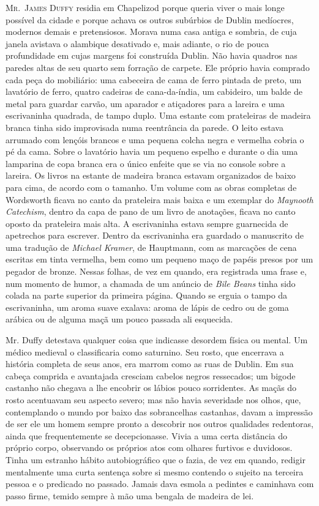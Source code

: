 \textsc{Mr.~James Duffy} residia em Chapelizod porque queria viver o mais
longe possível da cidade e porque achava os outros subúrbios de Dublin
medíocres, modernos demais e pretensiosos. Morava numa casa antiga e
sombria, de cuja janela avistava o alambique desativado e, mais
adiante, o rio de pouca profundidade em cujas margens foi construída
Dublin. Não havia quadros nas paredes altas de seu quarto sem forração
de carpete. Ele próprio havia comprado cada peça do mobiliário: uma
cabeceira de cama de ferro pintada de preto, um lavatório de ferro,
quatro cadeiras de cana-da-índia, um cabideiro, um balde de metal para
guardar carvão, um aparador e atiçadores para a lareira e uma
escrivaninha quadrada, de tampo duplo. Uma estante com prateleiras
de madeira branca tinha sido improvisada numa reentrância da parede.
O leito estava arrumado com lençóis brancos e uma pequena colcha
negra e vermelha cobria o pé da cama. Sobre o lavatório havia um
pequeno espelho e durante o dia uma lamparina de copa branca era o
único enfeite que se via no console sobre a lareira. Os livros na
estante de madeira branca estavam organizados de baixo para cima, de
acordo com o tamanho. Um volume com as obras completas de Wordsworth
ficava no canto da prateleira mais baixa e um exemplar do \textit{Maynooth
Catechism}, dentro da capa de pano de um livro de anotações, ficava no
canto oposto da prateleira mais alta. A escrivaninha estava sempre
guarnecida de apetrechos para escrever. Dentro da escrivaninha era
guardado o manuscrito de uma tradução de \textit{Michael Kramer}, de Hauptmann,
com as marcações de cena escritas em tinta vermelha, bem como um
pequeno maço de papéis presos por um pegador de bronze. Nessas
folhas, de vez em quando, era registrada uma frase e, num momento de
humor, a chamada de um anúncio de \textit{Bile Beans} tinha sido colada na
parte superior da primeira página. Quando se erguia o tampo da
escrivaninha, um aroma suave exalava: aroma de lápis de cedro ou de
goma arábica ou de alguma maçã um pouco passada ali esquecida.

Mr. Duffy detestava qualquer coisa que indicasse desordem física ou
mental. Um médico medieval o classificaria como saturnino. Seu
rosto, que encerrava a história completa de seus anos, era marrom como
as ruas de Dublin. Em sua cabeça comprida e avantajada cresciam
cabelos negros ressecados; um bigode castanho não chegava a lhe
encobrir os lábios pouco sorridentes. As maçãs do rosto acentuavam seu
aspecto severo; mas não havia severidade nos olhos, que, contemplando
o mundo por baixo das sobrancelhas castanhas, davam a impressão de ser
ele um homem sempre pronto a descobrir nos outros qualidades
redentoras, ainda que frequentemente se decepcionasse. Vivia a uma
certa distância do próprio corpo, observando os próprios atos com
olhares furtivos e duvidosos. Tinha um estranho hábito
autobiográfico que o fazia, de vez em quando, redigir mentalmente
uma curta sentença sobre si mesmo contendo o sujeito na terceira
pessoa e o predicado no passado. Jamais dava esmola a pedintes e
caminhava com passo firme, temido sempre à mão uma bengala de madeira
de lei.

